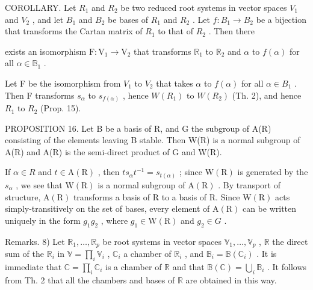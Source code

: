 COROLLARY. Let \(R_{1}\) and \(R_{2}\) be two reduced root systems in vector spaces \(V_{1}\) and \(V_{2}\) , and let \(B_{1}\) and \(B_{2}\) be bases of \(R_{1}\) and \(R_{2}\) . Let \(f: B_{1} \to B_{2}\) be a bijection that transforms the Cartan matrix of \(R_{1}\) to that of \(R_{2}\) . Then there

exists an isomorphism \(\mathrm{F}: \mathrm{V}_1 \to \mathrm{V}_2\) that transforms \(\mathbb{R}_1\) to \(\mathbb{R}_2\) and \(\alpha\) to \(f(\alpha)\) for all \(\alpha \in \mathbb{B}_1\) .

Let F be the isomorphism from \(V_{1}\) to \(V_{2}\) that takes \(\alpha\) to \(f(\alpha)\) for all \(\alpha \in B_{1}\) . Then F transforms \(s_{\alpha}\) to \(s_{f(\alpha)}\) , hence \(W(R_{1})\) to \(W(R_{2})\) (Th. 2), and hence \(R_{1}\) to \(R_{2}\) (Prop. 15).

PROPOSITION 16. Let B be a basis of R, and G the subgroup of A(R) consisting of the elements leaving B stable. Then W(R) is a normal subgroup of A(R) and A(R) is the semi-direct product of G and W(R).

If \(\alpha\in R\) and \(t\in\mathrm{A}(\mathrm{R})\) , then \(ts_{\alpha}t^{-1}=s_{t(\alpha)}\) ; since \(\mathrm{W}(\mathrm{R})\) is generated by the \(s_{\alpha}\) , we see that \(\mathrm{W}(\mathrm{R})\) is a normal subgroup of \(\mathrm{A}(\mathrm{R})\) . By transport of structure, \(\mathrm{A}(\mathrm{R})\) transforms a basis of R to a basis of R. Since \(\mathrm{W}(\mathrm{R})\) acts simply-transitively on the set of bases, every element of \(\mathrm{A}(\mathrm{R})\) can be written uniquely in the form \(g_{1}g_{2}\) , where \(g_{1}\in\mathrm{W}(\mathrm{R})\) and \(g_{2}\in G\) .

Remarks. 8) Let \(\mathbb{R}_1, \ldots, \mathbb{R}_p\) be root systems in vector spaces \(\mathbb{V}_1, \ldots, \mathbb{V}_p\) , \(\mathbb{R}\) the direct sum of the \(\mathbb{R}_i\) in \(\mathbb{V} = \prod_i \mathbb{V}_i\) , \(\mathbb{C}_i\) a chamber of \(\mathbb{R}_i\) , and \(\mathbb{B}_i = \mathbb{B}(\mathbb{C}_i)\) . It is immediate that \(\mathbb{C} = \prod_i \mathbb{C}_i\) is a chamber of \(\mathbb{R}\) and that \(\mathbb{B}(\mathbb{C}) = \bigcup_i \mathbb{B}_i\) . It follows from Th. 2 that all the chambers and bases of \(\mathbb{R}\) are obtained in this way.

